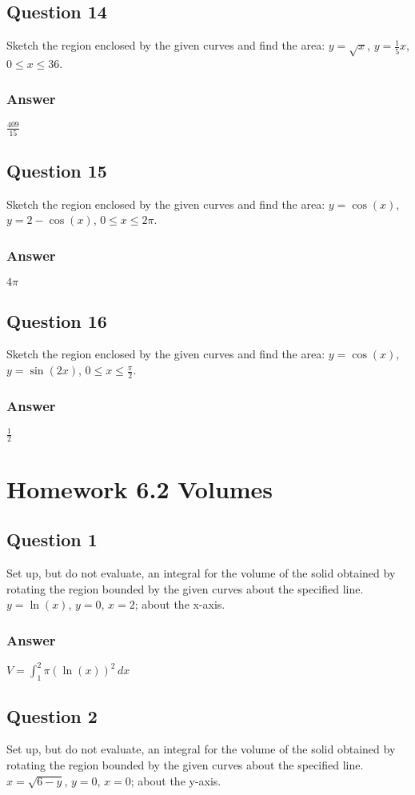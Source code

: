 \documentclass{article}
\begin{document}
\subsection*{Question 14}
Sketch the region enclosed by the given curves and find the area: $y=\sqrt{x}$, $y=\frac{1}{5}x$, $0 \le x \le 36$.
\subsubsection*{Answer}
$ \frac{409}{15} $

\subsection*{Question 15}
Sketch the region enclosed by the given curves and find the area: $y=\cos(x)$, $y=2-\cos(x)$, $0 \le x \le 2\pi$.
\subsubsection*{Answer}
$ 4\pi $

\subsection*{Question 16}
Sketch the region enclosed by the given curves and find the area: $y=\cos(x)$, $y=\sin(2x)$, $0 \le x \le \frac{\pi}{2}$.
\subsubsection*{Answer}
$ \frac{1}{2} $

\newpage
\section{Homework 6.2 Volumes}

\subsection*{Question 1}
Set up, but do not evaluate, an integral for the volume of the solid obtained by rotating the region bounded by the given curves about the specified line. $y=\ln(x)$, $y=0$, $x=2$; about the x-axis.
\subsubsection*{Answer}
$ V = \int_1^2 \pi(\ln(x))^2 \,dx $

\subsection*{Question 2}
Set up, but do not evaluate, an integral for the volume of the solid obtained by rotating the region bounded by the given curves about the specified line. $x=\sqrt{6-y}$, $y=0$, $x=0$; about the y-axis.
\end{document}
